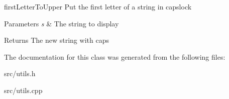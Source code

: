 first\+Letter\+To\+Upper Put the first letter of a string in capslock 


\begin{DoxyParams}{Parameters}
{\em s} & The string to display \\
\hline
\end{DoxyParams}
\begin{DoxyReturn}{Returns}
The new string with caps 
\end{DoxyReturn}


The documentation for this class was generated from the following files\+:\begin{DoxyCompactItemize}
\item 
src/utils.\+h\item 
src/utils.\+cpp\end{DoxyCompactItemize}
